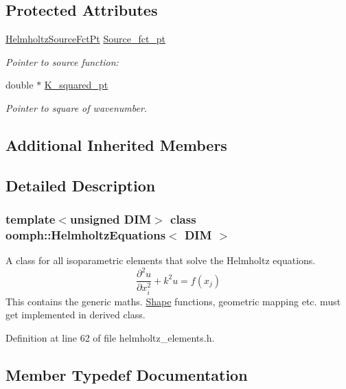 \subsection*{Protected Attributes}
\begin{DoxyCompactItemize}
\item 
\hyperlink{classoomph_1_1HelmholtzEquations_a630648023d91bba9ee9a900353a1ea58}{Helmholtz\+Source\+Fct\+Pt} \hyperlink{classoomph_1_1HelmholtzEquations_a896c6598347fd09c47b2aaf57841db85}{Source\+\_\+fct\+\_\+pt}
\begin{DoxyCompactList}\small\item\em Pointer to source function\+: \end{DoxyCompactList}\item 
double $\ast$ \hyperlink{classoomph_1_1HelmholtzEquations_a4c7cc6c365429927ab113b2fc26988c0}{K\+\_\+squared\+\_\+pt}
\begin{DoxyCompactList}\small\item\em Pointer to square of wavenumber. \end{DoxyCompactList}\end{DoxyCompactItemize}
\subsection*{Additional Inherited Members}


\subsection{Detailed Description}
\subsubsection*{template$<$unsigned D\+IM$>$\newline
class oomph\+::\+Helmholtz\+Equations$<$ D\+I\+M $>$}

A class for all isoparametric elements that solve the Helmholtz equations. \[ \frac{\partial^2 u}{\partial x_i^2} + k^2 u = f(x_j) \] This contains the generic maths. \hyperlink{classoomph_1_1Shape}{Shape} functions, geometric mapping etc. must get implemented in derived class. 

Definition at line 62 of file helmholtz\+\_\+elements.\+h.



\subsection{Member Typedef Documentation}
\mbox{\label{classoomph_1_1HelmholtzEquations_a630648023d91bba9ee9a900353a1ea58}} 
